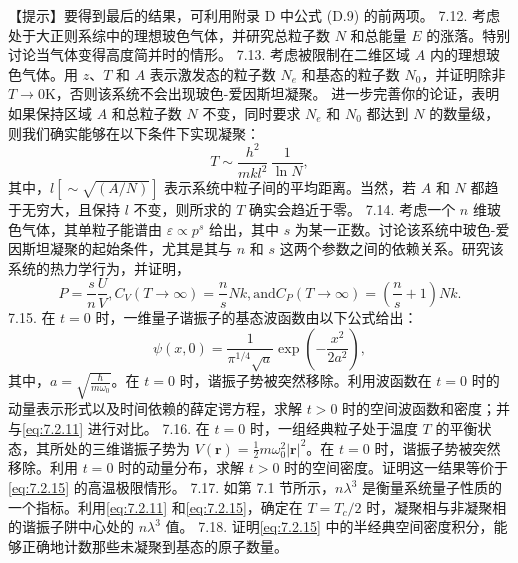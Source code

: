 【提示】要得到最后的结果，可利用附录 D 中公式 (D.9) 的前两项。
7.12. 考虑处于大正则系综中的理想玻色气体，并研究总粒子数 \(N\) 和总能量 \(E\) 的涨落。特别讨论当气体变得高度简并时的情形。
7.13. 考虑被限制在二维区域 \(A\) 内的理想玻色气体。用 \(z\)、\(T\) 和 \(A\) 表示激发态的粒子数 \(N_{e}\) 和基态的粒子数 \(N_{0}\)，并证明除非 \(T \rightarrow 0\)K，否则该系统不会出现玻色-爱因斯坦凝聚。
进一步完善你的论证，表明如果保持区域 \(A\) 和总粒子数 \(N\) 不变，同时要求 \(N_{e}\) 和 \(N_{0}\) 都达到 \(N\) 的数量级，则我们确实能够在以下条件下实现凝聚：
\begin{equation}\tag{7.5.57}\label{eq:7.5.57}
T \sim \frac { h ^{2} } { m k l ^{2} } \, \frac { 1 } { \ln N } ,
\end{equation}
其中，\(l[\sim\sqrt{(A/N)}]\) 表示系统中粒子间的平均距离。当然，若 \(A\) 和 \(N\) 都趋于无穷大，且保持 \(l\) 不变，则所求的 \(T\) 确实会趋近于零。
7.14. 考虑一个 \(n\) 维玻色气体，其单粒子能谱由 \(\varepsilon \propto p^{s}\) 给出，其中 \(s\) 为某一正数。讨论该系统中玻色-爱因斯坦凝聚的起始条件，尤其是其与 \(n\) 和 \(s\) 这两个参数之间的依赖关系。研究该系统的热力学行为，并证明，
\begin{equation}\tag{7.5.58}\label{eq:7.5.58}
P = \frac { s } { n } \frac { U } { V } ,  C _ { V } ( T \rightarrow \infty ) = \frac { n } { s } N k ,  \mathrm { a n d }  C _ { P } ( T \rightarrow \infty ) = \left( \frac { n } { s } + 1 \right) N k .
\end{equation}
7.15. 在 \(t=0\) 时，一维量子谐振子的基态波函数由以下公式给出：
\begin{equation}\tag{7.5.59}\label{eq:7.5.59}
\psi ( x , 0 ) = \frac { 1 } { \pi ^{1 / 4} \sqrt { a } } \exp \left( - \frac { x ^{2} } { 2 a ^{2} } \right) ,
\end{equation}
其中，\(a=\sqrt{\frac{\hbar}{m\omega_{0}}}\)。在 \(t=0\) 时，谐振子势被突然移除。利用波函数在 \(t=0\) 时的动量表示形式以及时间依赖的薛定谔方程，求解 \(t>0\) 时的空间波函数和密度；并与\autoref{eq:7.2.11} 进行对比。
7.16. 在 \(t=0\) 时，一组经典粒子处于温度 \(T\) 的平衡状态，其所处的三维谐振子势为 \(V(\boldsymbol{r})=\frac{1}{2}m\omega_{0}^{2}|\boldsymbol{r}|^{2}\)。在 \(t=0\) 时，谐振子势被突然移除。利用 \(t=0\) 时的动量分布，求解 \(t>0\) 时的空间密度。证明这一结果等价于\autoref{eq:7.2.15} 的高温极限情形。
7.17. 如第 7.1 节所示，\(n\lambda^{3}\) 是衡量系统量子性质的一个指标。利用\autoref{eq:7.2.11} 和\autoref{eq:7.2.15}，确定在 \(T=T_{c}/2\) 时，凝聚相与非凝聚相的谐振子阱中心处的 \(n\lambda^{3}\) 值。
7.18. 证明\autoref{eq:7.2.15} 中的半经典空间密度积分，能够正确地计数那些未凝聚到基态的原子数量。
